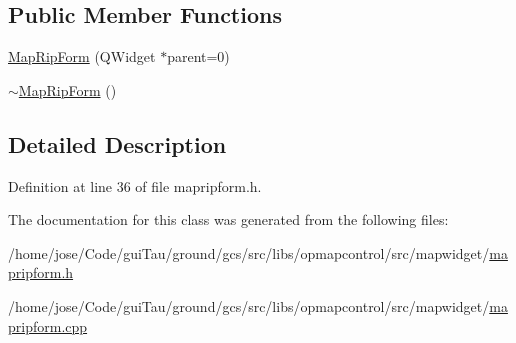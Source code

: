 \subsection*{Public Member Functions}
\begin{DoxyCompactItemize}
\item 
\hyperlink{group___o_p_map_widget_ga992a9478361267f44a0935b7fb7c8476}{Map\-Rip\-Form} (Q\-Widget $\ast$parent=0)
\item 
\hyperlink{group___o_p_map_widget_gabc703f61b0a3e678f85ec3fa6b9c896a}{$\sim$\-Map\-Rip\-Form} ()
\end{DoxyCompactItemize}


\subsection{Detailed Description}


Definition at line 36 of file mapripform.\-h.



The documentation for this class was generated from the following files\-:\begin{DoxyCompactItemize}
\item 
/home/jose/\-Code/gui\-Tau/ground/gcs/src/libs/opmapcontrol/src/mapwidget/\hyperlink{mapripform_8h}{mapripform.\-h}\item 
/home/jose/\-Code/gui\-Tau/ground/gcs/src/libs/opmapcontrol/src/mapwidget/\hyperlink{mapripform_8cpp}{mapripform.\-cpp}\end{DoxyCompactItemize}
